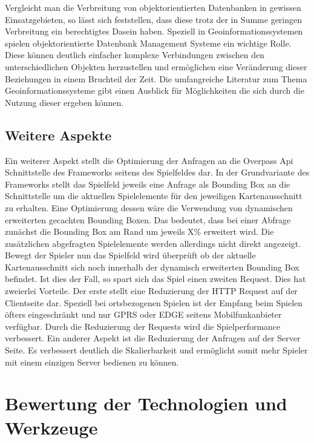 Vergleicht man die Verbreitung von objektorientierten Datenbanken in gewissen Einsatzgebieten, so lässt sich feststellen, dass diese trotz der in Summe geringen Verbreitung ein berechtigtes Dasein haben. Speziell in Geoinformationssystemen spielen objektorientierte Datenbank Management Systeme ein wichtige Rolle.\cite{Brinkhoff.2005} Diese können deutlich einfacher komplexe Verbindungen zwischen den unterschiedlichen Objekten herzustellen und ermöglichen eine Veränderung dieser Beziehungen in einem Bruchteil der Zeit. Die umfangreiche Literatur zum Thema Geoinformationssysteme gibt einen Ausblick für Möglichkeiten die sich durch die Nutzung dieser ergeben können.

\subsection*{Weitere Aspekte}

Ein weiterer Aspekt stellt die Optimierung der Anfragen an die Overpass Api Schnittstelle des Frameworks seitens des Spielfeldes dar. In der Grundvariante des Frameworks stellt das Spielfeld jeweils eine Anfrage als Bounding Box an die Schnittstelle um die aktuellen Spielelemente für den jeweiligen Kartenausschnitt zu erhalten. Eine Optimierung dessen wäre die Verwendung von dynamischen erweiterten gecachten Bounding Boxen. Das bedeutet, dass bei einer Abfrage zunächst die Bounding Box am Rand um jeweils X\% erweitert wird. Die zusätzlichen abgefragten Spielelemente werden allerdings nicht direkt angezeigt. Bewegt der Spieler nun das Spielfeld wird überprüft ob der aktuelle Kartenausschnitt sich noch innerhalb der dynamisch erweiterten Bounding Box befindet. Ist dies der Fall, so spart sich das Spiel einen zweiten Request. Dies hat zweierlei Vorteile. Der erste stellt eine Reduzierung der HTTP Request auf der Clientseite dar. Speziell bei ortsbezogenen Spielen ist der Empfang beim Spielen öfters eingeschränkt und nur GPRS oder EDGE seitens Mobilfunkanbieter verfügbar. Durch die Reduzierung der Requests wird die Spielperformance verbessert. Ein anderer Aspekt ist die Reduzierung der Anfragen auf der Server Seite. Es verbessert deutlich die Skalierbarkeit und ermöglicht somit mehr Spieler mit einem einzigen Server bedienen zu können.


\section{Bewertung der Technologien und Werkzeuge}

